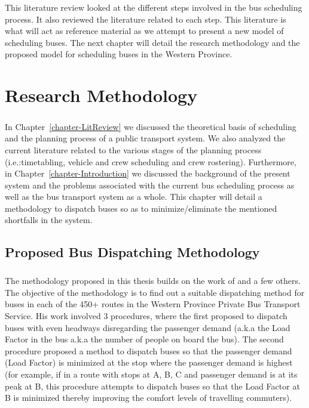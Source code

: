 \documentclass[12pt, oneside]{report}
\begin{document}
This literature review looked at the different steps involved in the bus scheduling process. It also reviewed the literature related to each step. This literature is what will act as reference material as we attempt to present a new model of scheduling buses. The next chapter will detail the research methodology and the proposed model for scheduling buses in the Western Province.

\newpage

\chapter{Research Methodology}
\label{chapter-ResearchMethodology}

\paragraph{ } In Chapter~\ref{chapter-LitReview} we discussed the theoretical basis of scheduling and the planning process of a public transport system. We also analyzed the current literature related to the various stages of the planning process (i.e.:timetabling, vehicle and crew scheduling and crew rostering). Furthermore, in Chapter~\ref{chapter-Introduction} we discussed the background of the present system and the problems associated with the current bus scheduling process as well as the bus transport system as a whole. This chapter will detail a methodology to dispatch buses so as to minimize/eliminate the mentioned shortfalls in the system.

\section{Proposed Bus Dispatching Methodology}

\paragraph{ } The methodology proposed in this thesis builds on the work of \citet{Ceder2009} and a few others. The objective of the methodology is to find out a suitable dispatching method for buses in each of the 450+ routes in the Western Province Private Bus Transport Service. His work involved 3 procedures, where the first proposed to dispatch buses with even headways disregarding the passenger demand (a.k.a the Load Factor in the bus a.k.a the number of people on board the bus). The second procedure proposed a method to dispatch buses so that the passenger demand (Load Factor) is minimized at the stop where the passenger demand is highest (for example, if in a route with stops at A, B, C and passenger demand is at its peak at B, this procedure attempts to dispatch buses so that the Load Factor at B is minimized thereby improving the comfort levels of travelling commuters).
\end{document}
